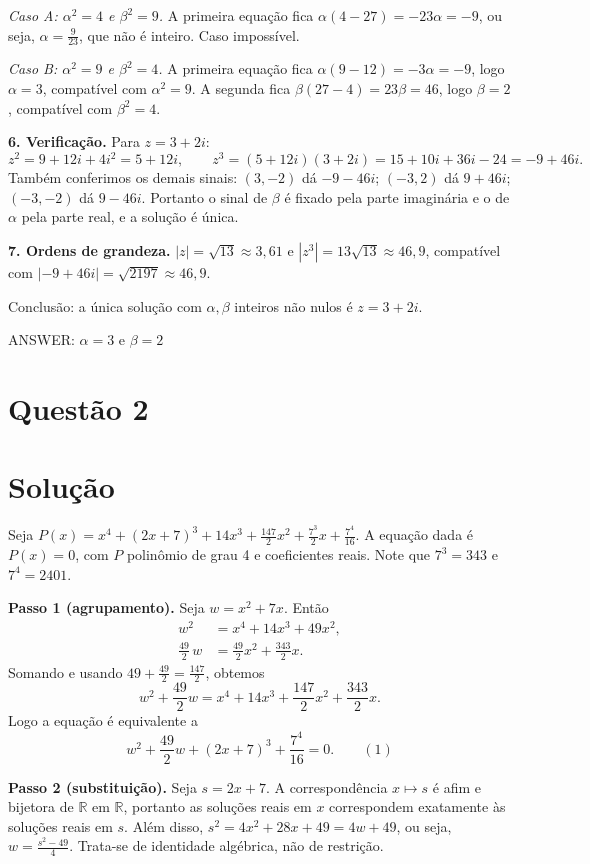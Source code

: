 \documentclass{article}%
\begin{document}
\emph{Caso A: $\alpha^2 = 4$ e $\beta^2 = 9$.} A primeira equação fica $\alpha(4 - 27) = -23\alpha = -9$, ou seja, $\alpha = \frac{9}{23}$, que não é inteiro. Caso impossível.

\emph{Caso B: $\alpha^2 = 9$ e $\beta^2 = 4$.} A primeira equação fica $\alpha(9 - 12) = -3\alpha = -9$, logo $\alpha = 3$, compatível com $\alpha^2 = 9$. A segunda fica $\beta(27 - 4) = 23\beta = 46$, logo $\beta = 2$, compatível com $\beta^2 = 4$.

\textbf{6. Verificação.} Para $z = 3 + 2i$:
\[
z^2 = 9 + 12i + 4i^2 = 5 + 12i, \qquad z^3 = (5 + 12i)(3 + 2i) = 15 + 10i + 36i - 24 = -9 + 46i .
\]
Também conferimos os demais sinais: $(3, -2)$ dá $-9 - 46i$; $(-3, 2)$ dá $9 + 46i$; $(-3, -2)$ dá $9 - 46i$. Portanto o sinal de $\beta$ é fixado pela parte imaginária e o de $\alpha$ pela parte real, e a solução é única.

\textbf{7. Ordens de grandeza.} $|z| = \sqrt{13} \approx 3,61$ e $|z^3| = 13\sqrt{13} \approx 46,9$, compatível com $|-9 + 46i| = \sqrt{2197} \approx 46,9$.

Conclusão: a única solução com $\alpha, \beta$ inteiros não nulos é $z = 3 + 2i$.

ANSWER: $\alpha = 3$ e $\beta = 2$%
\newpage%
\section*{Questão 2}

\section*{Solução}

Seja $P(x)=x^4+(2x+7)^3+14x^3+\frac{147}{2}x^2+\frac{7^3}{2}x+\frac{7^4}{16}$. A equação dada é $P(x)=0$, com $P$ polinômio de grau 4 e coeficientes reais. Note que $7^3=343$ e $7^4=2401$.

\textbf{Passo 1 (agrupamento).} Seja $w=x^2+7x$. Então
\begin{align*}
w^2&=x^4+14x^3+49x^2,\\
\frac{49}{2}\,w&=\frac{49}{2}x^2+\frac{343}{2}x.
\end{align*}
Somando e usando $49+\frac{49}{2}=\frac{147}{2}$, obtemos
$$w^2+\frac{49}{2}w=x^4+14x^3+\frac{147}{2}x^2+\frac{343}{2}x.$$
Logo a equação é equivalente a
$$w^2+\frac{49}{2}w+(2x+7)^3+\frac{7^4}{16}=0. \qquad (1)$$

\textbf{Passo 2 (substituição).} Seja $s=2x+7$. A correspondência $x\mapsto s$ é afim e bijetora de $\mathbb{R}$ em $\mathbb{R}$, portanto as soluções reais em $x$ correspondem exatamente às soluções reais em $s$. Além disso, $s^2=4x^2+28x+49=4w+49$, ou seja, $w=\frac{s^2-49}{4}$. Trata-se de identidade algébrica, não de restrição.
\end{document}
